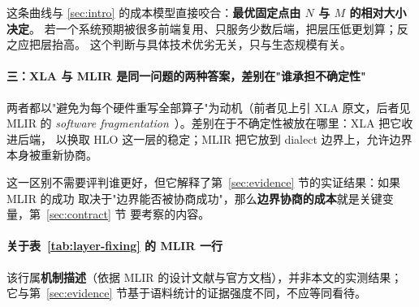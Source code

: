 这条曲线与 \ref{sec:intro} 的成本模型直接咬合：\textbf{最优固定点由 $N$ 与 $M$ 的相对大小决定}。
若一个系统预期被很多前端复用、只服务少数后端，把层压低更划算；反之应把层抬高。
这个判断与具体技术优劣无关，只与生态规模有关。

\paragraph{三：XLA 与 MLIR 是同一问题的两种答案，差别在"谁承担不确定性"}
两者都以"避免为每个硬件重写全部算子"为动机（前者见上引 XLA 原文，后者见 MLIR 的
\emph{software fragmentation}~\cite{mlir21}）。差别在于不确定性被放在哪里：XLA 把它收进后端，
以换取 HLO 这一层的稳定；MLIR 把它放到 dialect 边界上，允许边界本身被重新协商。

这一区别不需要评判谁更好，但它解释了第~\ref{sec:evidence} 节的实证结果：如果 MLIR 的成功
取决于"边界能否被协商成功"，那么\textbf{边界协商的成本}就是关键变量，第~\ref{sec:contract} 节
要考察的内容。

\paragraph{关于表~\ref{tab:layer-fixing} 的 MLIR 一行}
该行属\textbf{机制描述}（依据 MLIR 的设计文献与官方文档），并非本文的实测结果；
它与第~\ref{sec:evidence} 节基于语料统计的证据强度不同，不应等同看待。
